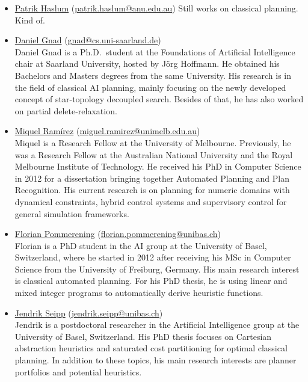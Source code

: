\documentclass[10pt]{article}
\begin{document}
\begin{itemize}

\item \href{http://http://users.cecs.anu.edu.au/~patrik/}{Patrik Haslum}
(\href{mailto:patrik.haslum@anu.edu.au}{patrik.haslum@anu.edu.au})
Still works on classical planning. Kind of.

\item \href{http://}{Daniel Gnad}
(\href{mailto:gnad@cs.uni-saarland.de}{gnad@cs.uni-saarland.de})\\
Daniel Gnad is a Ph.D.\ student at the Foundations of Artificial
Intelligence chair at Saarland University, hosted by J\"org
Hoffmann. He obtained his Bachelors and Masters degrees from the same
University. His research is in the field of classical AI planning,
mainly focusing on the newly developed concept of star-topology
decoupled search. Besides of that, he has also worked on partial
delete-relaxation.

\item \href{http://findanexpert.unimelb.edu.au/display/person778610#tab-overview}{Miquel Ram\'{i}rez}
(\href{mailto:miguel.ramirez@unimelb.edu.au}{miguel.ramirez@unimelb.edu.au})\\
Miquel is a Research Fellow at the University of Melbourne. Previously, he was
a Research Fellow at the Australian National University and the Royal Melbourne
Institute of Technology. He
received his PhD in Computer Science in 2012 for a dissertation
bringing together Automated Planning and Plan Recognition. His current
research is on planning for numeric domains with dynamical constraints, hybrid control
systems and supervisory control for general simulation frameworks.

 \item \href{http://ai.cs.unibas.ch/people/pommeren}{Florian Pommerening}
   (\href{mailto:florian.pommerening@unibas.ch}{florian.pommerening@unibas.ch})\\
   Florian is a PhD student in the AI group at the University of Basel,
   Switzerland, where he started in 2012 after receiving his MSc in
   Computer Science from the University of Freiburg, Germany. His main
   research interest is classical automated planning. For his PhD
   thesis, he is using linear and mixed integer programs to
   automatically derive heuristic functions.

 \item \href{http://ai.cs.unibas.ch/people/seipp}{Jendrik Seipp}
   (\href{mailto:jendrik.seipp@unibas.ch}{jendrik.seipp@unibas.ch})\\
   Jendrik is a postdoctoral researcher in the Artificial Intelligence
   group at the University of Basel, Switzerland. His PhD thesis focuses
   on Cartesian abstraction heuristics and saturated cost partitioning
   for optimal classical planning. In addition to these topics, his main
   research interests are planner portfolios and potential heuristics.


\end{itemize}
\end{document}
